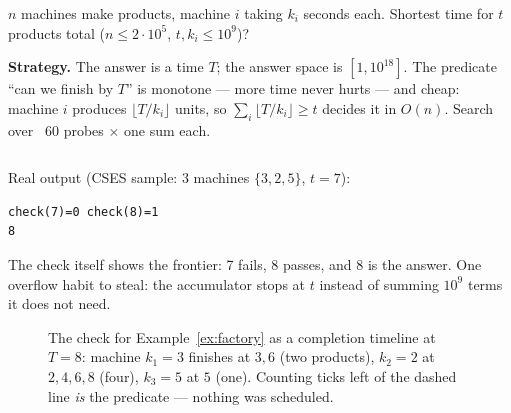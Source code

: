 \begin{example}\label{ex:factory}
$n$ machines make products, machine $i$ taking $k_i$ seconds each.
Shortest time for $t$ products total ($n \le 2\cdot10^5$, $t,k_i \le
10^9$)?
\par\smallskip
\textbf{Strategy.} The answer is a time $T$; the answer space is
$[1, 10^{18}]$. The predicate ``can we finish by $T$'' is monotone ---
more time never hurts --- and cheap: machine $i$ produces
$\lfloor T/k_i \rfloor$ units, so $\sum_i \lfloor T/k_i \rfloor \ge t$
decides it in $O(n)$. Search over ~60 probes $\times$ one sum each.
\par\smallskip
\begin{solution}
\begin{lstlisting}[language=C++,caption={\texttt{factory\_machines.cpp}:
the check plus the driver.},label={lst:factory}]
\end{lstlisting}

\end{solution}
Real output (CSES sample: $3$ machines $\{3,2,5\}$, $t=7$):
\begin{lstlisting}[numbers=none]
check(7)=0 check(8)=1
8
\end{lstlisting}
The check itself shows the frontier: 7 fails, 8 passes, and 8 is the
answer. One overflow habit to steal: the accumulator stops at $t$
instead of summing $10^9$ terms it does not need.
\end{example}

\begin{figure}[ht]\centering

\caption{The check for Example~\ref{ex:factory} as a completion
timeline at $T=8$: machine $k_1{=}3$ finishes at $3,6$ (two products),
$k_2{=}2$ at $2,4,6,8$ (four), $k_3{=}5$ at $5$ (one). Counting ticks
left of the dashed line \emph{is} the predicate --- nothing was
scheduled.}
\label{fig:timeline}
\end{figure}

